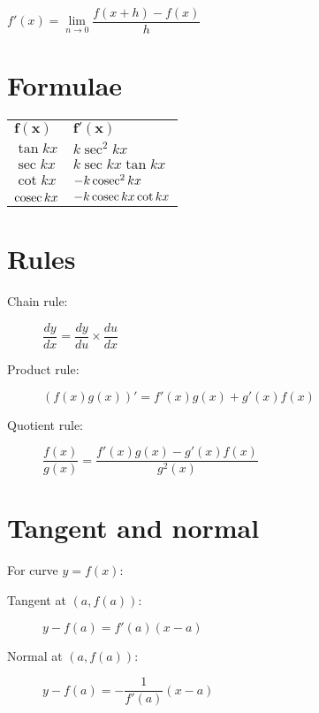 $f'(x) = \lim\limits_{n \to 0}\dfrac{f(x+h)-f(x)}{h}$

\section{Formulae}
\begin{tabular}{ll}
    $\mathbf{f(x)}$ & $\mathbf{f'(x)}$      \\
    $\tan kx$       & $k\sec^2 kx$          \\
    $\sec kx$       & $k\sec kx \tan kx$    \\
    $\cot kx$       & $-k\operatorname{cosec}^2 kx$       \\
    $\operatorname{cosec} kx$     & $-k\operatorname{cosec} kx \cot kx$ \\
\end{tabular}

\section{Rules}
\begin{description}
    \item[Chain rule:] $\dfrac{dy}{dx} = \dfrac{dy}{du} \times \dfrac{du}{dx}$
    \item[Product rule:] $(f(x)g(x))'=f'(x)g(x)+g'(x)f(x)$
    \item[Quotient rule:] $\dfrac{f(x)}{g(x)} = \dfrac{f'(x)g(x)-g'(x)f(x)}{g^2(x)}$
\end{description}


\section{Tangent and normal}
For curve $y=f(x)$:
\begin{description}
    \item[Tangent at $(a,f(a))$:] $y-f(a)=f'(a)(x-a)$
    \item[Normal at $(a,f(a))$:] $y-f(a)=-\dfrac{1}{f'(a)}(x-a)$
\end{description}
